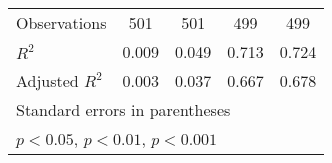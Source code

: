 {\begin{tabular}{l*{4}{c}}
\hline
Observations        &         501         &         501         &         499         &         499         \\
\(R^{2}\)           &       0.009         &       0.049         &       0.713         &       0.724         \\
Adjusted \(R^{2}\)  &       0.003         &       0.037         &       0.667         &       0.678         \\
\hline\hline
\multicolumn{5}{l}{\footnotesize Standard errors in parentheses}\\
\multicolumn{5}{l}{\footnotesize \sym{*} \(p<0.05\), \sym{**} \(p<0.01\), \sym{***} \(p<0.001\)}\\
\end{tabular}
}
